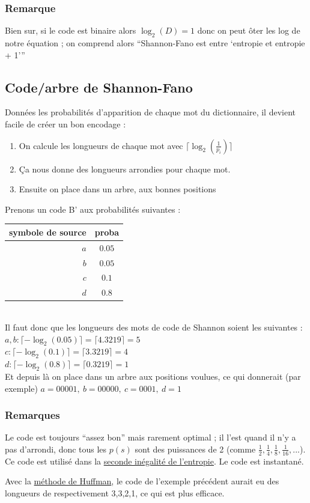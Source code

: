 \documentclass[11pt,a4paper]{article}
\begin{document}
\subsubsection{Remarque}
Bien sur, si le code est binaire alors $\log_2(D) = 1$ donc on peut ôter les log de notre équation ; on comprend alors \enquote{Shannon-Fano est entre \enquote{entropie et entropie + 1}}
\subsection{Code/arbre de Shannon-Fano}
\label{shannon}
Données les probabilités d'apparition de chaque mot du dictionnaire, il devient facile de créer un bon encodage :
\begin{enumerate}
	\item On calcule les longueurs de chaque mot avec $\lceil \log_2\left(\frac{1}{p_i}\right)\rceil$
	\item Ça nous donne des longueurs arrondies pour chaque mot.
	\item Ensuite on place dans un arbre, aux bonnes positions
\end{enumerate}
\begin{exemple}
	Prenons un code B' aux probabilités suivantes :
	\begin{tabular}{r|c}
	\hline
	symbole de source & proba\\
	\hline
	$a$ & $0.05$\\
	$b$ & $0.05$\\
	$c$ & $0.1$\\
	$d$ & $0.8$\\
	\hline
	\end{tabular}\\
	Il faut donc que les longueurs des mots de code de Shannon soient les suivantes :  \\
	$a,b : \lceil-\log_2(0.05)\rceil = \lceil4.3219\rceil = 5$\\
	$c : \lceil-\log_2(0.1)\rceil = \lceil3.3219\rceil = 4$\\
	$d : \lceil-\log_2(0.8)\rceil = \lceil0.3219\rceil = 1$\\
	Et depuis là on place dans un arbre aux positions voulues, ce qui donnerait (par exemple) $a = 00001,\ b = 00000,\ c = 0001,\ d = 1$
\end{exemple}

\subsubsection{Remarques} Le code est toujours \enquote{assez bon} mais rarement optimal ; il l'est quand il n'y a pas d'arrondi, donc tous les $p(s)$ sont des puissances de 2 (comme $\frac{1}{2},\frac{1}{4},\frac{1}{8},\frac{1}{16},...$). Ce code est utilisé dans la \hyperref[seconde inegalite entropie]{seconde inégalité de l'entropie}. Le code est instantané.
\begin{exemple}
	Avec la \hyperref[code huffman]{méthode de Huffman}, le code de l'exemple précédent aurait eu des longueurs de respectivement 3,3,2,1, ce qui est plus efficace.
\end{exemple}
\end{document}
